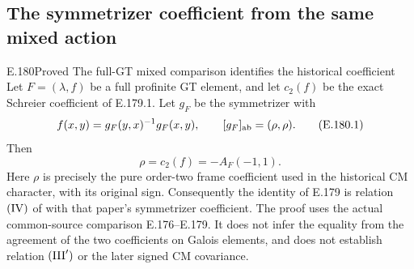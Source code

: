 \subsection{The symmetrizer coefficient from the same mixed action}

\begin{result}{E.180}{Proved}
{The full-GT mixed comparison identifies the historical coefficient}
Let \(F=(\lambda,f)\) be a full profinite GT element,
and let \(c_2(f)\) be the exact Schreier coefficient
of E.179.1.  Let \(g_F\) be the symmetrizer with
\[
 f(x,y)=g_F(y,x)^{-1}g_F(x,y),\qquad
 [g_F]_{\rm ab}=(\rho,\rho).
\tag{E.180.1}
\]
Then
\[
                         \rho=c_2(f)=-A_F(-1,1).
\tag{E.180.2}
\]
Here \(\rho\) is precisely the pure order-two frame
coefficient used in the historical CM character,
with its original sign.  Consequently the identity
of E.179 is relation \(({\rm IV})\) of
\citet[\S1, author p.3]{SymNakamuraSchneps2000}
with that paper's symmetrizer coefficient.
The proof uses the actual common-source comparison
E.176--E.179.  It does not infer the equality from
the agreement of the two coefficients on Galois
elements, and does not establish relation
\(({\rm III}')\) or the later signed CM covariance.
\end{result}

